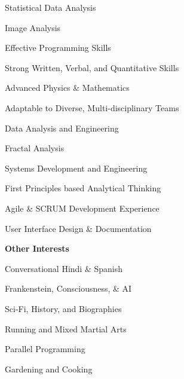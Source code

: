 \documentclass[letterpaper,final]{memoir}
\newcommand{\LargeSep}{\vspace{1.3em}}
\newcommand{\Sep}{\vspace{1.0em}}
\newcommand{\SmallSep}{\vspace{0.4em}}
\newcommand{\CVItem}[1]
	{\textbf{\color{Blue} #1}}
\begin{document}
\begin{multicols}{2}

    \begin{compactitem}[\color{Blue}$\circ$]

        \item Statistical Data Analysis
        \SmallSep
        \item Image Analysis
        \SmallSep
        \item Effective Programming Skills
        \SmallSep
        \item Strong Written, Verbal, and Quantitative Skills
        \SmallSep
        \item Advanced Physics \& Mathematics
        \SmallSep
        \item Adaptable to Diverse, Multi-disciplinary Teams
        \SmallSep
        \item Data Analysis and Engineering
        \SmallSep
        \item Fractal Analysis
        \SmallSep
        \item Systems Development and Engineering
        \SmallSep
        \item First Principles based Analytical Thinking
        \SmallSep
        \item Agile \& SCRUM Development Experience
        \SmallSep
        \item User Interface Design \&  Documentation
        
	\end{compactitem}

\end{multicols}

\Sep

\CVItem{Other Interests}
\Sep

\begin{multicols}{2}

    \begin{compactitem}[\color{Blue}$\circ$] 
        
        \item Conversational  Hindi \& Spanish
        \SmallSep
        \item Frankenstein, Consciousness, \& AI
        \SmallSep
        \item Sci-Fi, History, and Biographies
        \SmallSep
        \item Running and Mixed Martial Arts
        \SmallSep
        \item Parallel Programming
        \SmallSep
        \item Gardening and Cooking
        

	\end{compactitem}
\end{multicols}
\LargeSep
\end{document}
